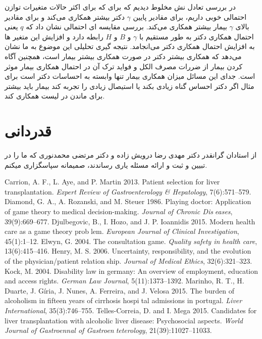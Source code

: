 \documentclass[12pt]{article}
\begin{document}
{{{{{{{{در بررسی تعادل نش مخلوط دیدیم که برای که برای اکثر حالات متغیرات توازن احتمالی خوبی داریم، برای مقادیر پایین $\gamma$  دکتر بیشتر همکاری می‌کند و برای مقادیر بالای $\gamma$  بیمار بیشتر همکاری می‌کند.
بررسی مقایسه ای احتمالی نشان داد که $q$ یعنی احتمال همکاری دکتر به طور مستقیم با $\gamma$ و $B$ و $H$ رابطه دارد و افزایش این متغیر ها به افزایش احتمال همکاری دکتر می‌انجامد.
نتیجه گیری تحلیلی این موضوع به ما نشان می‌دهد که همکاری بیشتر دکتر در صورت همکاری بیشتر بیمار است، همچنین آگاه کردن بیمار از ضررات مصرف الکل و فواید ترک آن در احتمال همکاری بیمار موثر است. جدای این مسائل میزان همکاری بیمار تنها وابسته به احساسات دکتر است برای مثال اگر دکتر احساس گناه زیادی بکند یا استیصال زیادی را تجربه کند بیمار باید بیشتر برای ماندن در لیست همکاری کند.\\

\section*{قدردانی}
از استادان گرانقدر دکتر مهدی رضا درویش زاده و دکتر مرتضی محمدنوری که ما را در  تبیین و ثبت و ارائه مسئله یاری رساندند، صمیمانه سپاسگزاری میکنم.

\setLTRbibitems
\begin{thebibliography}{99}
	\resetlatinfont
	Carrion, A. F., L. Aye, and P. Martin 2013. Patient
	selection for liver transplantation. \textit{Expert Review
		of Gastroenterology \& Hepatology}, 7(6):571–579.
	Diamond, G. A., A. Rozanski, and M. Steuer 1986.
	Playing doctor: Application of game theory to
	medical decision-making. \textit{Journal of Chronic Diseases}, 39(9):669–677.
	Djulbegovic, B., I. Hozo, and J. P. Ioannidis 2015.
	Modern health care as a game theory problem. \textit{European Journal of Clinical Investigation},
	45(1):1–12.
	Elwyn, G. 2004. The consultation game. \textit{Quality
		safety in health care}, 13(6):415–416.
	Henry, M. S. 2006. Uncertainty, responsibility, and
	the evolution of the physician/patient relationship. \textit{Journal of Medical Ethics}, 32(6):321–323.
	Kock, M. 2004. Disability law in germany: An
	overview of employment, education and access
	rights. \textit{German Law Journal}, 5(11):1373–1392.
	Marinho, R. T., H. Duarte, J. Gíria, J. Nunes,
	A. Ferreira, and J. Velosa 2015. The burden
	of alcoholism in fifteen years of cirrhosis hospital admissions in portugal. \textit{Liver International},
	35(3):746–755.
	Telles-Correia, D. and I. Mega 2015. Candidates for
	liver transplantation with alcoholic liver disease:
	Psychosocial aspects. \textit{World Journal of Gastroennal of Gastroenteterology}, 21(39):11027–11033.
\end{thebibliography}
}}}}}}}}
\end{document}
